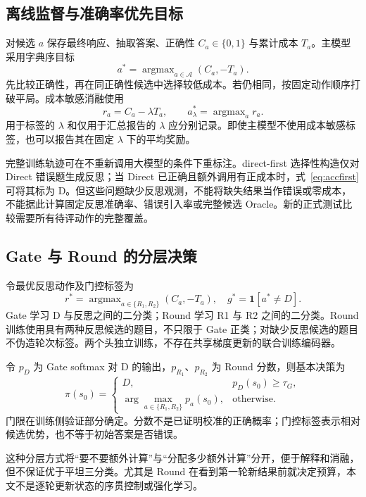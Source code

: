\documentclass[11pt]{article}
\begin{document}
\subsection{离线监督与准确率优先目标}
对候选 $a$ 保存最终响应、抽取答案、正确性 $C_a\in\{0,1\}$ 与累计成本 $T_a$。主模型采用字典序目标
\begin{equation}
a^*=\mathop{\arg\max}_{a\in\mathcal A}(C_a,-T_a).
\label{eq:accfirst}
\end{equation}
先比较正确性，再在同正确性候选中选择较低成本。若仍相同，按固定动作顺序打破平局。成本敏感消融使用
\begin{equation}
r_a=C_a-\lambda T_a,\qquad a^*_{\lambda}=\mathop{\arg\max}_a r_a.
\label{eq:reward}
\end{equation}
用于标签的 $\lambda$ 和仅用于汇总报告的 $\lambda$ 应分别记录。即使主模型不使用成本敏感标签，也可以报告其在固定 $\lambda$ 下的平均奖励。

完整训练轨迹可在不重新调用大模型的条件下重标注。direct-first 选择性构造仅对 Direct 错误题生成反思；当 Direct 已正确且额外调用有正成本时，式~\ref{eq:accfirst} 可将其标为 D。但这些问题缺少反思观测，不能将缺失结果当作错误或零成本，不能据此计算固定反思准确率、错误引入率或完整候选 Oracle。新的正式测试比较需要所有待评动作的完整覆盖。

\subsection{Gate 与 Round 的分层决策}
令最优反思动作及门控标签为
\begin{equation}
r^*=\mathop{\arg\max}_{a\in\{R_1,R_2\}}(C_a,-T_a),\quad g^*=\mathbf{1}[a^*\ne D].
\end{equation}
Gate 学习 D 与反思之间的二分类；Round 学习 R1 与 R2 之间的二分类。Round 训练使用具有两种反思候选的题目，不只限于 Gate 正类；对缺少反思候选的题目不伪造轮次标签。两个头独立训练，不存在共享梯度更新的联合训练编码器。

令 $p_D$ 为 Gate softmax 对 D 的输出，$p_{R_1}$、$p_{R_2}$ 为 Round 分数，则基本决策为
\begin{equation}
\pi(s_0)=\begin{cases}
D,&p_D(s_0)\geq\tau_G,\\
\arg\max_{a\in\{R_1,R_2\}}p_a(s_0),&\text{otherwise}.
\end{cases}
\label{eq:policy}
\end{equation}
门限在训练侧验证部分确定。分数不是已证明校准的正确概率；门控标签表示相对候选优势，也不等于初始答案是否错误。

这种分层方式将“要不要额外计算”与“分配多少额外计算”分开，便于解释和消融，但不保证优于平坦三分类。尤其是 Round 在看到第一轮新结果前就决定预算，本文不是逐轮更新状态的序贯控制或强化学习。
\end{document}
